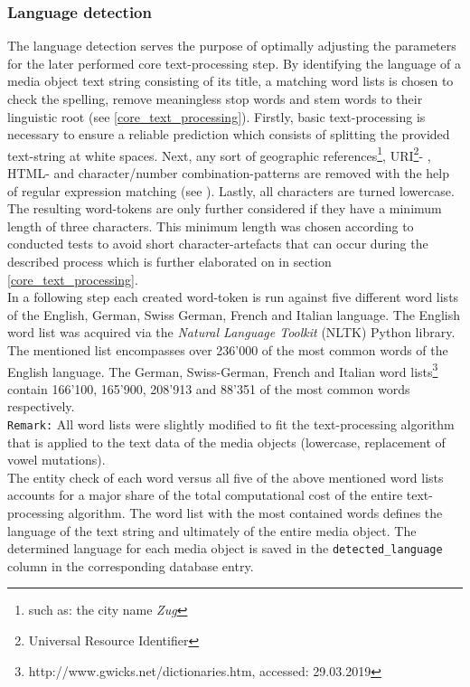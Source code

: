 \subsubsection{Language detection} \label{language_detection}
The language detection serves the purpose of optimally adjusting the parameters for the later performed core text-processing step. By identifying the language of a media object text string consisting of its title, a matching word lists is chosen to check the spelling, remove meaningless stop words and stem words to their linguistic root (see \ref{core_text_processing}). Firstly, basic text-processing is necessary to ensure a reliable prediction which consists of splitting the provided text-string at white spaces. Next, any sort of geographic references\footnote{such as: the city name \textit{Zug}}, URI\footnote{Universal Resource Identifier}- , HTML- and character/number combination-patterns are removed with the help of regular expression matching (see ). Lastly, all characters are turned lowercase. The resulting word-tokens are only further considered if they have a minimum length of three characters. This minimum length was chosen according to conducted tests to avoid short character-artefacts that can occur during the described process which is further elaborated on in section \ref{core_text_processing}.\\
In a following step each created word-token is run against five different word lists of the English, German, Swiss German, French and Italian language.
The English word list was acquired via the \textit{Natural Language Toolkit} (NLTK) Python library. The mentioned list encompasses over 236'000 of the most common words of the English language.
The German, Swiss-German, French and Italian word lists\footnote{http://www.gwicks.net/dictionaries.htm, accessed: 29.03.2019} contain 166'100, 165'900, 208'913 and 88'351 of the most common words respectively.\\
\newline
\texttt{Remark:} All word lists were slightly modified to fit the text-processing algorithm that is applied to the text data of the media objects (lowercase, replacement of vowel mutations).\\
\newline
The entity check of each word versus all five of the above mentioned word lists accounts for a major share of the total computational cost of the entire text-processing algorithm. The word list with the most contained words defines the language of the text string and ultimately of the entire media object. The determined language for each media object is saved in the \texttt{detected\_language} column in the corresponding database entry.\\


